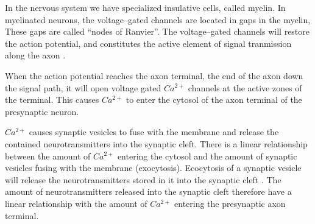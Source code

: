 In the nervous system we have specialized insulative cells, called myelin.
In myelinated neurons, the voltage--gated channels are located in gaps in the myelin, These gaps are called ``nodes of Ranvier''.
The voltage--gated channels will restore the action potential, and constitutes the active element of signal tranmission along the axon \cite{PrinciplesOfNeuralScience4edKAP09}.



When the action potential reaches the axon terminal, the end of the axon down the signal path, it will open voltage gated $Ca^{2+}$ channels at the active zones of the terminal. 
This causes $Ca^{2+}$ to enter the cytosol of the axon terminal of the presynaptic neuron\cite{PrinciplesOfNeuralScience4edKAP10}.

$Ca^{2+}$ causes synaptic vesicles to fuse with the membrane and release the contained neurotransmitters into the synaptic cleft.%
There is a linear relationship between the amount of $Ca^{2+}$ entering the cytosol and the amount of synaptic vesicles fusing with the membrane (exocytosis).%
Ecocytosis of a synaptic vesicle will release the neurotransmitters stored in it into the synaptic cleft \cite{PrinciplesOfNeuralScience4edKAP10}. 
The amount of neurotransmitters released into the synaptic cleft therefore have a linear relationship with the amount of $Ca^{2+}$ entering the presynaptic axon terminal.


